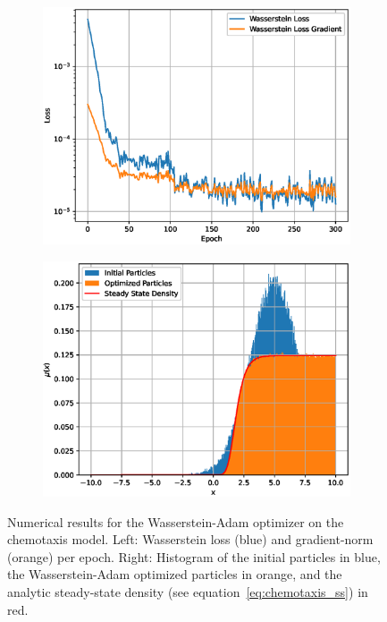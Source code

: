 \documentclass{article}
\begin{document}
\begin{figure}[h]
    \centering
    \begin{subfigure}[b]{0.51\textwidth}
        \centering
        \includegraphics[width=\textwidth]{figures/WassersteinChemotaxisLoss.eps}
    \end{subfigure}%
    \begin{subfigure}[b]{0.51\textwidth}
        \centering
        \includegraphics[width=\textwidth]{figures/WassersteinChemotaxisParticles.eps}
    \end{subfigure}
    \caption{Numerical results for the Wasserstein-Adam optimizer on the chemotaxis model. Left: Wasserstein loss (blue) and gradient-norm (orange) per epoch. Right: Histogram of the initial particles in blue, the Wasserstein-Adam optimized particles in orange, and the analytic steady-state density (see equation~\eqref{eq:chemotaxis_ss}) in red.}
    \label{fig:w2_chemotaxis}
\end{figure}
\end{document}
